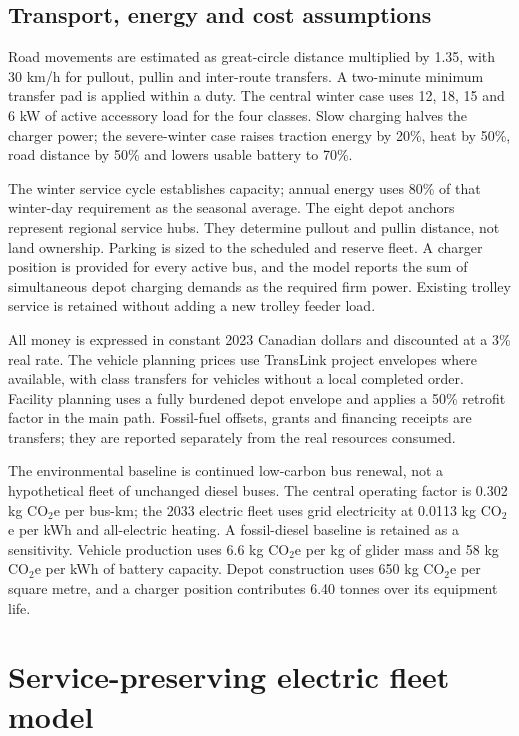 \documentclass[12pt,letterpaper]{article}
\begin{document}
\subsection{Transport, energy and cost assumptions}

Road movements are estimated as great-circle distance multiplied by 1.35, with 30 km/h for pullout, pullin and inter-route transfers. A two-minute minimum transfer pad is applied within a duty. The central winter case uses 12, 18, 15 and 6 kW of active accessory load for the four classes. Slow charging halves the charger power; the severe-winter case raises traction energy by 20\%, heat by 50\%, road distance by 50\% and lowers usable battery to 70\%.

The winter service cycle establishes capacity; annual energy uses 80\% of that winter-day requirement as the seasonal average. The eight depot anchors represent regional service hubs. They determine pullout and pullin distance, not land ownership. Parking is sized to the scheduled and reserve fleet. A charger position is provided for every active bus, and the model reports the sum of simultaneous depot charging demands as the required firm power. Existing trolley service is retained without adding a new trolley feeder load.\cite{fleet2020,corepm}

All money is expressed in constant 2023 Canadian dollars and discounted at a 3\% real rate. The vehicle planning prices use TransLink project envelopes where available, with class transfers for vehicles without a local completed order. Facility planning uses a fully burdened depot envelope and applies a 50\% retrofit factor in the main path. Fossil-fuel offsets, grants and financing receipts are transfers; they are reported separately from the real resources consumed.\cite{june2023tech,budget2025,bctariff2023,cpi2025}

The environmental baseline is continued low-carbon bus renewal, not a hypothetical fleet of unchanged diesel buses. The central operating factor is 0.302 kg CO$_2$e per bus-km; the 2033 electric fleet uses grid electricity at 0.0113 kg CO$_2$e per kWh and all-electric heating. A fossil-diesel baseline is retained as a sensitivity. Vehicle production uses 6.6 kg CO$_2$e per kg of glider mass and 58 kg CO$_2$e per kWh of battery capacity. Depot construction uses 650 kg CO$_2$e per square metre, and a charger position contributes 6.40 tonnes over its equipment life.\cite{icct2024,zhao2022,yeboah2025,bcgrid}

\section{Service-preserving electric fleet model}
\end{document}
